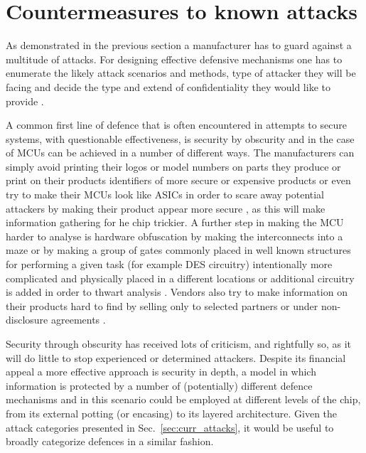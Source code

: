 \section{Countermeasures to known attacks}
\label{sec:defenses}

As demonstrated in the previous section a manufacturer has to guard against a multitude of attacks. For designing effective defensive mechanisms one has to enumerate the likely attack scenarios and methods, type of attacker they will be facing and decide the type and extend of confidentiality they would like to provide \citep{sergei:thesis} \citep{kocher:DPA}.

A common first line of defence that is often encountered in attempts to secure systems, with questionable effectiveness, is security by obscurity and in the case of MCUs can be achieved in a number of different ways. The manufacturers can simply avoid printing their logos or model numbers on parts they produce or print on their products identifiers of more secure or expensive products or even try to make their MCUs look like ASICs in order to scare away potential attackers by making their product appear more secure \citep{sergei:thesis} \citep{hwre}, as this will make information gathering for he chip trickier. A further step in making the MCU harder to analyse is hardware obfuscation by making the interconnects into a maze \citep{hwre} or by making a group of gates commonly placed in well known structures for performing a given task (for example DES circuitry) intentionally more complicated and physically placed in a different locations or additional circuitry is added in order to thwart analysis \citep{anderson:cautionary_note}. Vendors also try to make information on their products hard to find by selling only to selected partners or under non-disclosure agreements \citep{sergei:thesis}.

Security through obscurity has received lots of criticism, and rightfully so, as it will do little to stop experienced or determined attackers. Despite its financial appeal a more effective approach is security in depth, a model in which information is protected by a number of (potentially) different defence mechanisms and in this scenario could be employed at different levels of the chip, from its external potting (or encasing) to its layered architecture. Given the attack categories presented in Sec.~\ref{sec:curr_attacks}, it would be useful to broadly categorize defences in a similar fashion.

